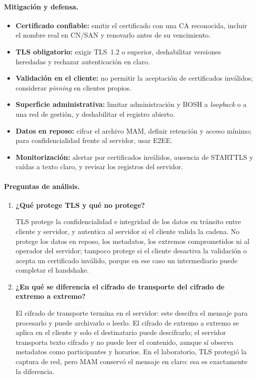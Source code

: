 \paragraph{Mitigación y defensa.}
\begin{itemize}
	\item \textbf{Certificado confiable:} emitir el certificado con una CA reconocida, incluir el nombre real en CN/SAN y renovarlo antes de su vencimiento.
	\item \textbf{TLS obligatorio:} exigir TLS~1.2 o superior, deshabilitar versiones heredadas y rechazar autenticación en claro.
	\item \textbf{Validación en el cliente:} no permitir la aceptación de certificados inválidos; considerar \textit{pinning} en clientes propios.
	\item \textbf{Superficie administrativa:} limitar administración y BOSH a \textit{loopback} o a una red de gestión, y deshabilitar el registro abierto.
	\item \textbf{Datos en reposo:} cifrar el archivo MAM, definir retención y acceso mínimo; para confidencialidad frente al servidor, usar E2EE.
	\item \textbf{Monitorización:} alertar por certificados inválidos, ausencia de STARTTLS y caídas a texto claro, y revisar los registros del servidor.
\end{itemize}

\paragraph{Preguntas de análisis.}
\begin{enumerate}
	\item \textbf{¿Qué protege TLS y qué no protege?}\par
	TLS protege la confidencialidad e integridad de los datos en tránsito entre cliente y servidor, y autentica al servidor si el cliente valida la cadena. No protege los datos en reposo, los metadatos, los extremos comprometidos ni al operador del servidor; tampoco protege si el cliente desactiva la validación o acepta un certificado inválido, porque en ese caso un intermediario puede completar el handshake.
	\item \textbf{¿En qué se diferencia el cifrado de transporte del cifrado de extremo a extremo?}\par
	El cifrado de transporte termina en el servidor: este descifra el mensaje para procesarlo y puede archivarlo o leerlo. El cifrado de extremo a extremo se aplica en el cliente y solo el destinatario puede descifrarlo; el servidor transporta texto cifrado y no puede leer el contenido, aunque sí observa metadatos como participantes y horarios. En el laboratorio, TLS protegió la captura de red, pero MAM conservó el mensaje en claro: esa es exactamente la diferencia.
\end{enumerate}

